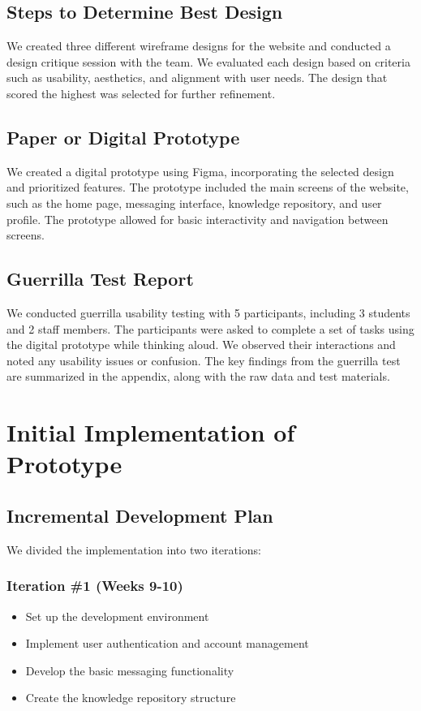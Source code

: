 \documentclass[12pt]{article}
\begin{document}
\subsection{Steps to Determine Best Design}
We created three different wireframe designs for the website and conducted a design critique session with the team. We evaluated each design based on criteria such as usability, aesthetics, and alignment with user needs. The design that scored the highest was selected for further refinement.

\subsection{Paper or Digital Prototype}
We created a digital prototype using Figma, incorporating the selected design and prioritized features. The prototype included the main screens of the website, such as the home page, messaging interface, knowledge repository, and user profile. The prototype allowed for basic interactivity and navigation between screens.

\subsection{Guerrilla Test Report}
We conducted guerrilla usability testing with 5 participants, including 3 students and 2 staff members. The participants were asked to complete a set of tasks using the digital prototype while thinking aloud. We observed their interactions and noted any usability issues or confusion. The key findings from the guerrilla test are summarized in the appendix, along with the raw data and test materials.

\newpage
\section{Initial Implementation of Prototype}
\subsection{Incremental Development Plan}
We divided the implementation into two iterations:

\subsubsection{Iteration \#1 (Weeks 9-10)}
\begin{itemize}
    \item Set up the development environment
    \item Implement user authentication and account management
    \item Develop the basic messaging functionality
    \item Create the knowledge repository structure
\end{itemize}
\end{document}
